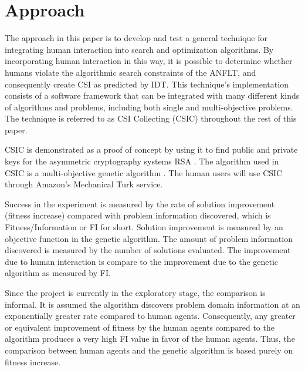 \section{Approach}\label{sec:solution-approach}

The approach in this paper is to develop and test a general technique for integrating  human interaction into search and optimization algorithms.  By incorporating human interaction in this way, it is possible to determine whether humans violate the algorithmic search constraints of the ANFLT, and consequently create CSI as predicted by IDT.  This technique's implementation consists of a software framework that can be integrated with many different kinds of algorithms and problems, including both single and multi-objective problems.  The technique is referred to as  CSI Collecting (CSIC) throughout the rest of this paper.

CSIC is demonstrated as a proof of concept by using it to find public and private keys for the asymmetric cryptography systems RSA \citep{cormen01:_introd_to_algor}.  The algorithm used in CSIC is a multi-objective genetic algorithm \citep{coello07:_evolut_algor_for_solvin_multi_objec_probl}.  The human users will use CSIC through Amazon's Mechanical Turk service.  

   Success in the experiment is measured by the rate of solution improvement (fitness increase) compared with problem information discovered, which is Fitness/Information or FI for short.  Solution improvement is measured by an objective function in the genetic algorithm.  The amount of problem information discovered is measured by the number of solutions evaluated.  The improvement due to human interaction is compare to the improvement due to the genetic algorithm as measured by FI.  

Since the project is currently in the exploratory stage, the comparison is informal.  It is assumed the algorithm discovers problem domain information at an exponentially greater rate compared to human agents.  Consequently, any greater or equivalent improvement of fitness by the human agents compared to the algorithm produces a very high FI value in favor of the human agents.  Thus, the comparison between human agents and the genetic algorithm is based purely on fitness increase.

